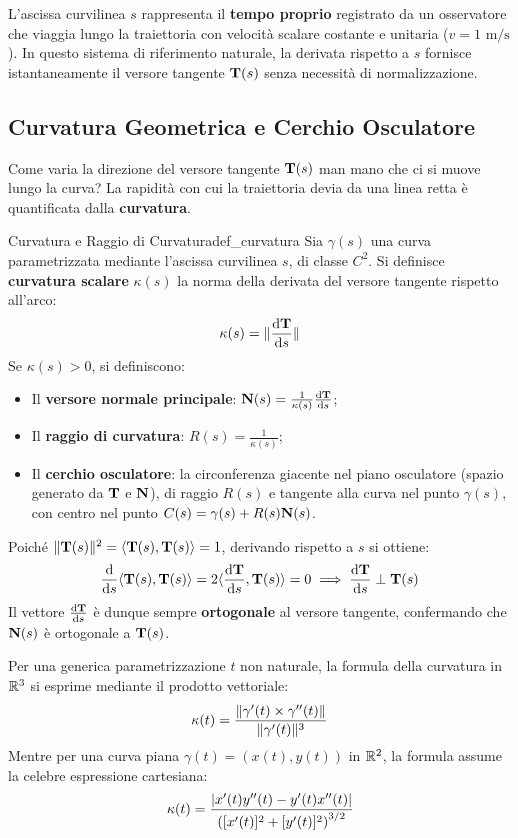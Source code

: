 \begin{osservazione}
L'ascissa curvilinea $s$ rappresenta il \textbf{tempo proprio} registrato da un osservatore che viaggia lungo la traiettoria con velocità scalare costante e unitaria ($v = 1\text{ m/s}$). In questo sistema di riferimento naturale, la derivata rispetto a $s$ fornisce istantaneamente il versore tangente $\mathbf{T}(s)$ senza necessità di normalizzazione.
\end{osservazione}

\subsection{Curvatura Geometrica e Cerchio Osculatore}

Come varia la direzione del versore tangente $\mathbf{T}(s)$ man mano che ci si muove lungo la curva? La rapidità con cui la traiettoria devia da una linea retta è quantificata dalla \textbf{curvatura}.

\begin{definizione}{Curvatura e Raggio di Curvatura}{def_curvatura}
Sia $\gamma(s)$ una curva parametrizzata mediante l'ascissa curvilinea $s$, di classe $C^2$. Si definisce \textbf{curvatura scalare} $\kappa(s)$ la norma della derivata del versore tangente rispetto all'arco:
\[
\kappa(s) = \lVert\frac{\mathop{}\!\mathrm{d} \mathbf{T}}{\mathop{}\!\mathrm{d} s}\rVert
\]
Se $\kappa(s) > 0$, si definiscono:
\begin{itemize}
    \item Il \textbf{versore normale principale}: $\mathbf{N}(s) = \frac{1}{\kappa(s)} \frac{\mathop{}\!\mathrm{d} \mathbf{T}}{\mathop{}\!\mathrm{d} s}$;
    \item Il \textbf{raggio di curvatura}: $R(s) = \frac{1}{\kappa(s)}$;
    \item Il \textbf{cerchio osculatore}: la circonferenza giacente nel piano osculatore (spazio generato da $\mathbf{T}$ e $\mathbf{N}$), di raggio $R(s)$ e tangente alla curva nel punto $\gamma(s)$, con centro nel punto $C(s) = \gamma(s) + R(s) \mathbf{N}(s)$.
\end{itemize}
\end{definizione}

Poiché $\lVert\mathbf{T}(s)\rVert^2 = \langle\mathbf{T}(s), \mathbf{T}(s)\rangle = 1$, derivando rispetto a $s$ si ottiene:
\[
\frac{\mathop{}\!\mathrm{d} }{\mathop{}\!\mathrm{d} s} \langle\mathbf{T}(s), \mathbf{T}(s)\rangle = 2 \langle\frac{\mathop{}\!\mathrm{d} \mathbf{T}}{\mathop{}\!\mathrm{d} s}, \mathbf{T}(s)\rangle = 0 \implies \frac{\mathop{}\!\mathrm{d} \mathbf{T}}{\mathop{}\!\mathrm{d} s} \perp \mathbf{T}(s)
\]
Il vettore $\frac{\mathop{}\!\mathrm{d} \mathbf{T}}{\mathop{}\!\mathrm{d} s}$ è dunque sempre \textbf{ortogonale} al versore tangente, confermando che $\mathbf{N}(s)$ è ortogonale a $\mathbf{T}(s)$.

Per una generica parametrizzazione $t$ non naturale, la formula della curvatura in $\mathbb{R}^3$ si esprime mediante il prodotto vettoriale:
\[
\kappa(t) = \frac{\lVert\gamma'(t) \times \gamma''(t)\rVert}{\lVert\gamma'(t)\rVert^3}
\]
Mentre per una curva piana $\gamma(t) = (x(t), y(t))$ in $\mathbb{R}^2$, la formula assume la celebre espressione cartesiana:
\[
\kappa(t) = \frac{\lvert x'(t) y''(t) - y'(t) x''(t)\rvert}{\left( [x'(t)]^2 + [y'(t)]^2 \right)^{3/2}}
\]

